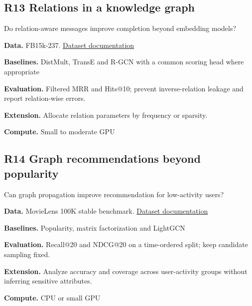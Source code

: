 \documentclass[11pt,letterpaper]{article}
\begin{document}
\begin{minipage}{\linewidth}\subsection*{R13 Relations in a knowledge graph}
Do relation-aware messages improve completion beyond embedding models?\par\textbf{Data.} FB15k-237. \href{https://pytorch-geometric.readthedocs.io/en/latest/generated/torch_geometric.datasets.RelLinkPredDataset.html}{Dataset documentation}\par
\textbf{Baselines.} DistMult, TransE and R-GCN with a common scoring head where appropriate\par
\textbf{Evaluation.} Filtered MRR and Hits@10; prevent inverse-relation leakage and report relation-wise errors.\par
\textbf{Extension.} Allocate relation parameters by frequency or sparsity.\par
\textbf{Compute.} Small to moderate GPU\par
\end{minipage}\par\vspace{8pt}
\begin{minipage}{\linewidth}\subsection*{R14 Graph recommendations beyond popularity}
Can graph propagation improve recommendation for low-activity users?\par\textbf{Data.} MovieLens 100K stable benchmark. \href{https://grouplens.org/datasets/movielens/100k/}{Dataset documentation}\par
\textbf{Baselines.} Popularity, matrix factorization and LightGCN\par
\textbf{Evaluation.} Recall@20 and NDCG@20 on a time-ordered split; keep candidate sampling fixed.\par
\textbf{Extension.} Analyze accuracy and coverage across user-activity groups without inferring sensitive attributes.\par
\textbf{Compute.} CPU or small GPU\par
\end{minipage}\par\vspace{8pt}
\end{document}
